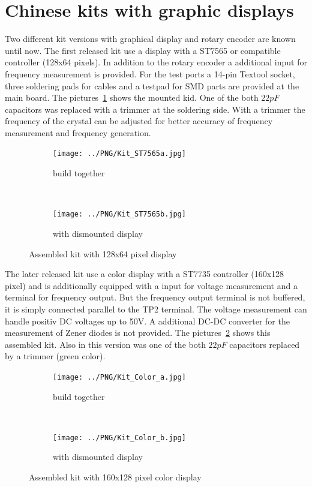 \section{Chinese kits with graphic displays}

Two different kit versions with graphical display and rotary encoder are known until now.
The first released kit use a display with a ST7565 or compatible controller (128x64 pixels).
In addition to the rotary encoder a additional input for frequency measurement is provided.
For the test ports a 14-pin Textool socket, three soldering pads for cables and a testpad
for SMD parts are provided at the main board.
The pictures~\ref{fig:Kit_mono} shows the mounted kid.
One of the both \(22 pF\) capacitors was replaced with a trimmer at the soldering side.
With a trimmer the frequency of the crystal can be adjusted for better accuracy of frequency measurement
and frequency generation. 

\begin{figure}[H]
  \begin{subfigure}[b]{.5\textwidth}
    \centering
    \texttt{[image: ../PNG/Kit\_ST7565a.jpg]}
    \caption{build together}
  \end{subfigure}
  ~
  \begin{subfigure}[b]{.5\textwidth}
    \centering
    \texttt{[image: ../PNG/Kit\_ST7565b.jpg]}
    \caption{with dismounted display}
  \end{subfigure}
  \caption{Assembled kit with 128x64 pixel display}
  \label{fig:Kit_mono}
\end{figure}

The later released kit use a color display with a ST7735 controller (160x128 pixel)
and is additionally equipped with a input for voltage measurement and a terminal for frequency output.
But the frequency output terminal is not buffered, it is simply connected parallel to the TP2 terminal.
The voltage measurement can handle positiv DC voltages up to 50V. A additional DC-DC converter
for the measurement of Zener diodes is not provided. 
The pictures~\ref{fig:Kit_color} shows this assembled kit.
Also in this version was one of the both \(22 pF\) capacitors replaced
by a trimmer (green color).

\begin{figure}[H]
  \begin{subfigure}[b]{.5\textwidth}
    \centering
    \texttt{[image: ../PNG/Kit\_Color\_a.jpg]}
    \caption{build together}
  \end{subfigure}
  ~
  \begin{subfigure}[b]{.5\textwidth}
    \centering
    \texttt{[image: ../PNG/Kit\_Color\_b.jpg]}
    \caption{with dismounted display}
  \end{subfigure}
  \caption{Assembled kit with 160x128 pixel color display}
  \label{fig:Kit_color}
\end{figure}

